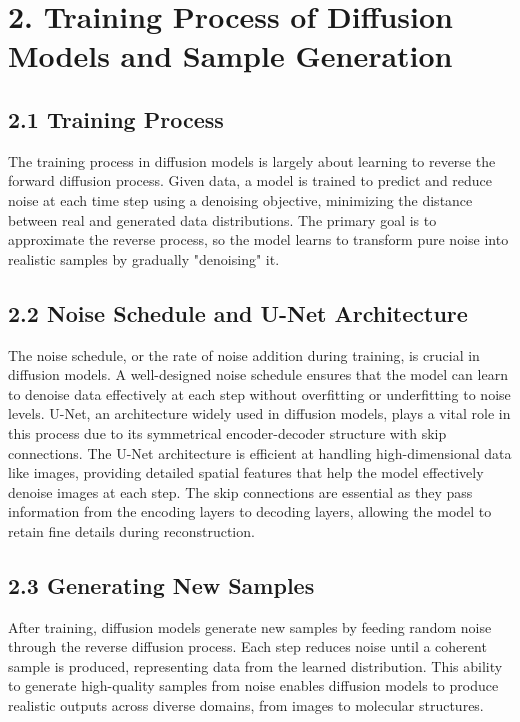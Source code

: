 \documentclass[12pt]{article}
\begin{document}
\section*{2. Training Process of Diffusion Models and Sample Generation}

\subsection*{2.1 Training Process}
The training process in diffusion models is largely about learning to reverse the forward diffusion process. Given data, a model is trained to predict and reduce noise at each time step using a denoising objective, minimizing the distance between real and generated data distributions. The primary goal is to approximate the reverse process, so the model learns to transform pure noise into realistic samples by gradually "denoising" it.

\subsection*{2.2 Noise Schedule and U-Net Architecture}
The noise schedule, or the rate of noise addition during training, is crucial in diffusion models. A well-designed noise schedule ensures that the model can learn to denoise data effectively at each step without overfitting or underfitting to noise levels. U-Net, an architecture widely used in diffusion models, plays a vital role in this process due to its symmetrical encoder-decoder structure with skip connections. The U-Net architecture is efficient at handling high-dimensional data like images, providing detailed spatial features that help the model effectively denoise images at each step. The skip connections are essential as they pass information from the encoding layers to decoding layers, allowing the model to retain fine details during reconstruction.

\subsection*{2.3 Generating New Samples}
After training, diffusion models generate new samples by feeding random noise through the reverse diffusion process. Each step reduces noise until a coherent sample is produced, representing data from the learned distribution. This ability to generate high-quality samples from noise enables diffusion models to produce realistic outputs across diverse domains, from images to molecular structures.
\end{document}
